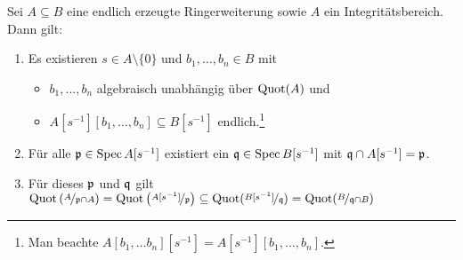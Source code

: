 \documentclass[12pt,a4paper]{scrartcl}
\theoremstyle{cplain}
\theoremstyle{cdef}
\begin{document}
\begin{kor} \label{kor:7.17}
	Sei $A \subseteq B$ eine endlich erzeugte Ringerweiterung sowie $A$ ein Integritätsbereich. Dann gilt: 
	\begin{enumerate}
		\item \label{kor:7.17:i} Es existieren $s \in A \setminus \{0\}$ und $b_1, \dots , b_n \in B$ mit
		\begin{itemize}
			\item $b_1, \dots , b_n$ algebraisch unabhängig über $\operatorname{Quot}(A)$ und
			\item $A[s^{-1}][b_1,\dots , b_n] \subseteq B[s^{-1}]$ endlich.\footnote{Man beachte $A[b_1, \dots b_n][s^{-1}]=A[s^{-1}][b_1, \dots , b_n]$.}
		\end{itemize}
		\item Für alle $\mathfrak{p}\in\operatorname{Spec} A [s^{-1}]$ existiert ein $\mathfrak{q} \in \operatorname{Spec} B[s^{-1}]$ mit $\mathfrak{q} \cap A[s^{-1}]=\mathfrak{p}$. \label{kor:7.17:ii}
		\item  Für dieses $\mathfrak{p}$ und $\mathfrak{q}$ gilt $\operatorname{Quot}\left( \nicefrac{A}{\mathfrak{p} \cap A} \right)=\operatorname{Quot} \left( \nicefrac{A[s^{-1}]}{\mathfrak{p}} \right) \subseteq \operatorname{Quot}(\nicefrac{B[s^{-1}]}{\mathfrak{q}})=\operatorname{Quot}(\nicefrac{B}{\mathfrak{q} \cap B})$ \label{kor:7.17:iii}
	\end{enumerate}
\end{kor}
\end{document}
